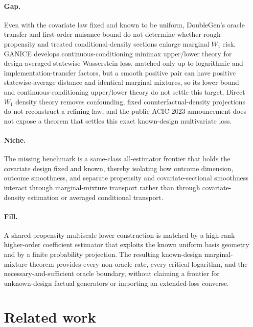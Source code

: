 \documentclass{article}
\begin{document}
\paragraph{Gap.} Even with the covariate law fixed and known to be uniform, DoubleGen's oracle transfer and first-order nuisance bound do not determine whether rough propensity and treated conditional-density sections enlarge marginal \(W_1\) risk. GANICE develops continuous-conditioning minimax upper/lower theory for design-averaged statewise Wasserstein loss, matched only up to logarithmic and implementation-transfer factors, but a smooth positive pair can have positive statewise-average distance and identical marginal mixtures, so its lower bound and continuous-conditioning upper/lower theory do not settle this target. Direct \(W_1\) density theory removes confounding, fixed counterfactual-density projections do not reconstruct a refining law, and the public ACIC 2023 announcement does not expose a theorem that settles this exact known-design multivariate loss.

\paragraph{Niche.} The missing benchmark is a same-class all-estimator frontier that holds the covariate design fixed and known, thereby isolating how outcome dimension, outcome smoothness, and separate propensity and covariate-sectional smoothness interact through marginal-mixture transport rather than through covariate-density estimation or averaged conditional transport.

\paragraph{Fill.} A shared-propensity multiscale lower construction is matched by a high-rank higher-order coefficient estimator that exploits the known uniform basis geometry and by a finite probability projection. The resulting known-design marginal-mixture theorem provides every non-oracle rate, every critical logarithm, and the necessary-and-sufficient oracle boundary, without claiming a frontier for unknown-design factual generators or importing an extended-loss converse.

\section{Related work}
\end{document}
